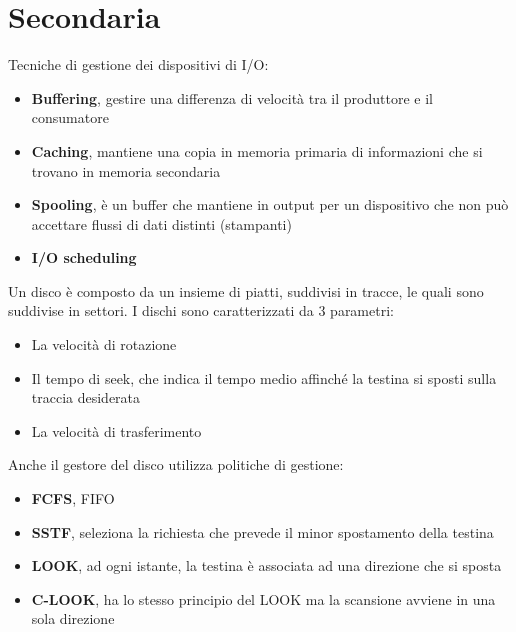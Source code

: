 \documentclass{article}
\begin{document}
\section{Secondaria}
Tecniche di gestione dei dispositivi di I/O:
\begin{itemize}
  \item \textbf{Buffering}, gestire una differenza di velocità tra il produttore e il consumatore
  \item \textbf{Caching}, mantiene una copia in memoria primaria di informazioni che si trovano in memoria secondaria
  \item \textbf{Spooling}, è un buffer che mantiene in output per un dispositivo che non può accettare flussi di dati distinti (stampanti)
  \item \textbf{I/O scheduling}
\end{itemize}
Un disco è composto da un insieme di piatti, suddivisi in tracce, le quali sono suddivise in settori. I dischi sono caratterizzati da $3$ parametri:
\begin{itemize}
  \item La velocità di rotazione
  \item Il tempo di seek, che indica il tempo medio affinché la testina si sposti sulla traccia desiderata
  \item La velocità di trasferimento
\end{itemize}
Anche il gestore del disco utilizza politiche di gestione:
\begin{itemize}
  \item \textbf{FCFS}, FIFO
  \item \textbf{SSTF}, seleziona la richiesta che prevede il minor spostamento della testina
  \item \textbf{LOOK}, ad ogni istante, la testina è associata ad una direzione che si sposta
  \item \textbf{C-LOOK}, ha lo stesso principio del LOOK ma la scansione avviene in una sola direzione
\end{itemize}
\end{document}
